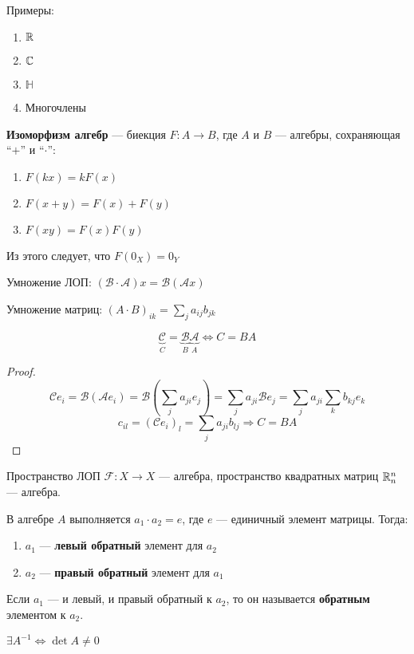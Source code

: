 Примеры:
\begin{enumerate}
    \item $\mathbb{R}$
    \item $\mathbb{C}$
    \item $\mathbb H$
    \item Многочлены
\end{enumerate}

\textbf{Изоморфизм алгебр} --- биекция $F : A\to B$, где $A$ и $B$ --- алгебры, сохраняющая ``$+$'' и ``$\cdot$'':
\begin{enumerate}
    \item $F(kx)=kF(x)$
    \item $F(x + y) = F(x) + F(y)$
    \item $F(xy) = F(x)F(y)$
\end{enumerate}

Из этого следует, что $F(0_X)=0_Y$


Умножение ЛОП: $(\mathcal B \cdot \mathcal A)x = \mathcal B(\mathcal A x)$

Умножение матриц: $(A\cdot B)_{ik}=\sum\limits_{j} a_{ij}b_{jk}$

\begin{theorem}
    $$\underbrace{\mathcal C}_{C} = \underbrace{\mathcal B}_{B} \underbrace{\mathcal A}_{A} \Leftrightarrow C = BA$$
\end{theorem}
\begin{proof}
    $$\mathcal C e_i = \mathcal B(\mathcal A e_i) = \mathcal B\left(\sum_{j} a_{ji}e_j\right)=\sum_j a_{ji} \mathcal B e_j = \sum_j a_{ji} \sum_k b_{kj} e_k$$
    $$c_{il} = (\mathcal C e_i)_l = \sum_j a_{ji} b_{lj} \Rightarrow C = BA$$
\end{proof}

Пространство ЛОП $\mathcal F : X\to X$ --- алгебра, пространство квадратных матриц $\mathbb{R}_n^n$ --- алгебра.


В алгебре $A$ выполняется $a_1 \cdot a_2 = e$, где $e$ --- единичный элемент матрицы. Тогда:
\begin{enumerate}
    \item $a_1$ --- \textbf{левый обратный} элемент для $a_2$
    \item $a_2$ --- \textbf{правый обратный} элемент для $a_1$
\end{enumerate}

Если $a_1$ --- и левый, и правый обратный к $a_2$, то он называется \textbf{обратным} элементом к $a_2$.

\begin{theorem}
    $\exists A^{−1} \Leftrightarrow \det A \not= 0$
\end{theorem}

